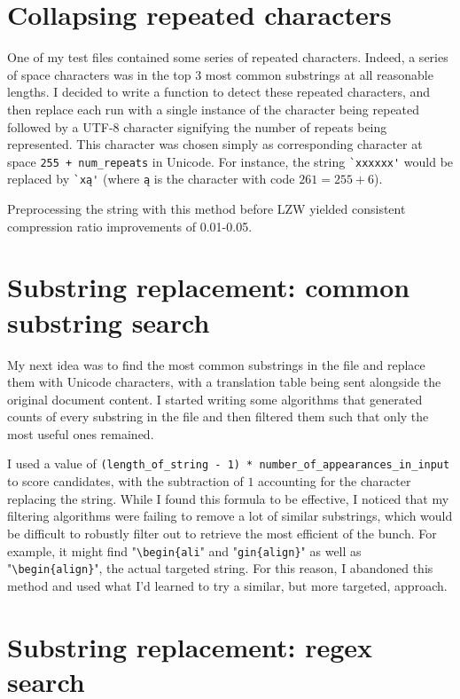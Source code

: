 \documentclass[11pt]{article} %
\begin{document}
\section{Collapsing repeated characters}

One of my test files contained some series of repeated characters. Indeed, a series of space characters was in the top 3 most common substrings at all reasonable lengths. I decided to write a function to detect these repeated characters, and then replace each run with a single instance of the character being repeated followed by a UTF-8 character signifying the number of repeats being represented. This character was chosen simply as corresponding character at space \verb|255 + num_repeats| in Unicode. For instance, the string \verb|`xxxxxx'| would be replaced by \verb|`xą'| (where \verb|ą| is the character with code $261 = 255 + 6$).

Preprocessing the string with this method before LZW yielded consistent compression ratio improvements of 0.01-0.05.


\section{Substring replacement: common substring search} \label{commonSubstringSearch}

My next idea was to find the most common substrings in the file and replace them with Unicode characters, with a translation table being sent alongside the original document content. I started writing some algorithms that generated counts of every substring in the file and then filtered them such that only the most useful ones remained.

I used a value of \verb|(length_of_string - 1) * number_of_appearances_in_input| to score candidates, with the subtraction of $1$ accounting for the character replacing the string. While I found this formula to be effective, I noticed that my filtering algorithms were failing to remove a lot of similar substrings, which would be difficult to robustly filter out to retrieve the most efficient of the bunch. For example, it might find "\verb|\begin{ali|" and "\verb|gin{align}|" as well as "\verb|\begin{align}|", the actual targeted string. For this reason, I abandoned this method and used what I'd learned to try a similar, but more targeted, approach.


\section{Substring replacement: regex search}
\end{document}
